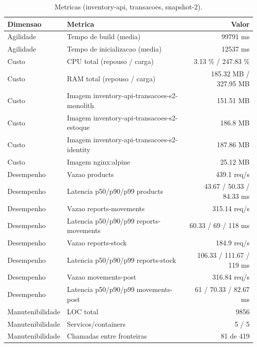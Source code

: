 \begin{table}[htb]
  \centering
  \caption{Metricas (inventory-api, transacoes, snapshot-2).}
  \label{tab:metricas-inventory-api-transacoes-snapshot-2}
  \begin{tabular}{llr}
    \hline
    \textbf{Dimensao} & \textbf{Metrica} & \textbf{Valor} \\
    \hline
    Agilidade & Tempo de build (media) & 99791 ms \\
    Agilidade & Tempo de inicializacao (media) & 12537 ms \\
    Custo & CPU total (repouso / carga) & 3.13 \% / 247.83 \% \\
    Custo & RAM total (repouso / carga) & 185.32 MB / 327.95 MB \\
    Custo & Imagem inventory-api-transacoes-s2-monolith & 151.51 MB \\
    Custo & Imagem inventory-api-transacoes-s2-estoque & 186.8 MB \\
    Custo & Imagem inventory-api-transacoes-s2-identity & 187.86 MB \\
    Custo & Imagem nginx:alpine & 25.12 MB \\
    Desempenho & Vazao products & 439.1 req/s \\
    Desempenho & Latencia p50/p90/p99 products & 43.67 / 50.33 / 84.33 ms \\
    Desempenho & Vazao reports-movements & 315.14 req/s \\
    Desempenho & Latencia p50/p90/p99 reports-movements & 60.33 / 69 / 118 ms \\
    Desempenho & Vazao reports-stock & 184.9 req/s \\
    Desempenho & Latencia p50/p90/p99 reports-stock & 106.33 / 111.67 / 119 ms \\
    Desempenho & Vazao movements-post & 316.84 req/s \\
    Desempenho & Latencia p50/p90/p99 movements-post & 61 / 70.33 / 82.67 ms \\
    Manutenibilidade & LOC total & 9856 \\
    Manutenibilidade & Servicos/containers & 5 / 5 \\
    Manutenibilidade & Chamadas entre fronteiras & 81 de 419 \\
    \hline
  \end{tabular}
\end{table}
